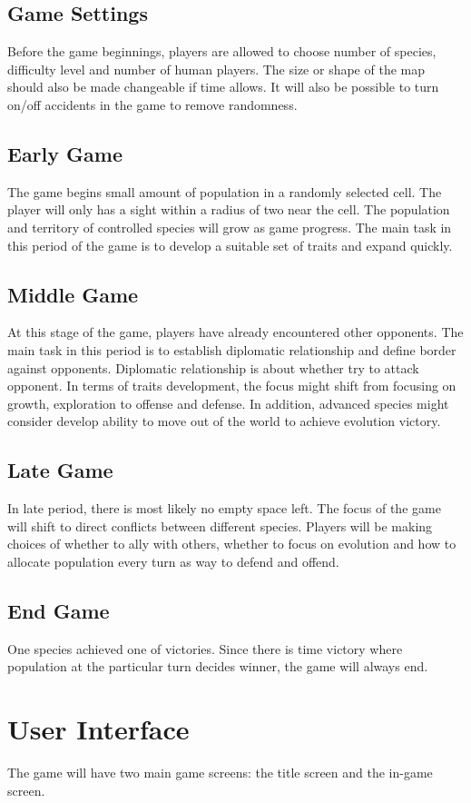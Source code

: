 \documentclass[12pt,a4paper]{article}
\begin{document}
\subsection{Game Settings}
Before the game beginnings, players are allowed to choose number of species, difficulty level and number of human players. The size or shape of the map should also be made changeable if time allows. It will also be possible to turn on/off accidents in the game to remove randomness.
\subsection{Early Game}
The game begins small amount of population in a randomly selected cell. The player will only has a sight within a radius of two near the cell. The population and territory of controlled species will grow as game progress. The main task in this period of the game is to develop a suitable set of traits and expand quickly.
\subsection{Middle Game}
At this stage of the game, players have already encountered other opponents. The main task in this period is to establish diplomatic relationship and define border against opponents. Diplomatic relationship is about whether try to attack opponent. In terms of traits development, the focus might shift from focusing on growth, exploration to offense and defense. In addition, advanced species might consider develop ability to move out of the world to achieve evolution victory.
\subsection{Late Game}
In late period, there is most likely no empty space left. The focus of the game will shift to direct conflicts between different species. Players will be making choices of whether to ally with others,  whether to focus on evolution and how to allocate population every turn as way to defend and offend.
\subsection{End Game}
One species achieved one of victories. Since there is time victory where population at the particular turn decides winner, the game will always end.

\section{User Interface}
The game will have two main game screens: the title screen and the in-game screen.
\end{document}

